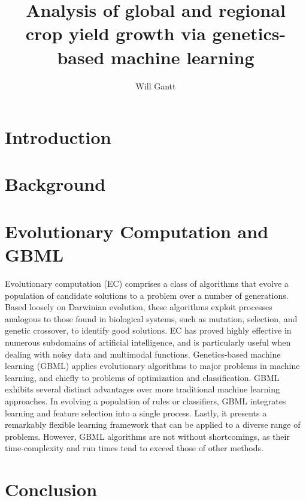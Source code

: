 \documentclass[11pt,twocolumn]{article}
\begin{document}
\title{Analysis of global and regional crop yield growth via genetics-based machine learning}
\author{Will Gantt}
\maketitle

\begin{@twocolumnfalse}
\end{@twocolumnfalse}

\section{Introduction}
\section{Background} 
\section{Evolutionary Computation and GBML}
Evolutionary computation (EC) comprises a class of algorithms that evolve a population of candidate solutions to a problem over a number of generations. Based loosely on Darwinian evolution, these algorithms exploit processes analogous to those found in biological systems, such as mutation, selection, and genetic crossover, to identify good solutions. EC has proved highly effective in numerous subdomains of artificial intelligence, and is particularly useful when dealing with noisy data and multimodal functions.
\indent Genetics-based machine learning (GBML) applies evolutionary algorithms to major problems in machine learning, and chiefly to problems of optimization and classification. GBML exhibits several distinct advantages over more traditional machine learning approaches. In evolving a population of rules or classifiers, GBML integrates learning and feature selection into a single process. Lastly, it presents a remarkably flexible learning framework that can be applied to a diverse range of problems.
\indent However, GBML algorithms are not without shortcomings, as their time-complexity and run times tend to exceed those of other methods.
\section{Conclusion}
\end{document}
